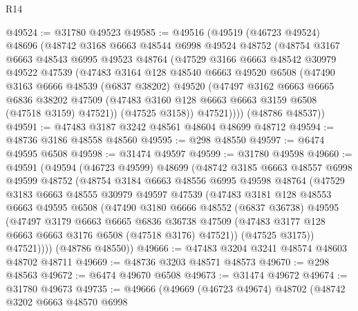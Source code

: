 \begin{lexlean}{R14}
\begin{coremodule}
@49524 := @31780 @49523
@49585 := @49516
    (@49519
      (@46723 @49524)
      @48696
      (@48742
        @3168
        @6663
        @48544
        @6998
        @49524
        @48752
        (@48754
          @3167
          @6663
          @48543
          @6995
          @49523
          @48764
          (@47529
            @3166
            @6663
            @48542
            @30979
            @49522
            @47539
            (@47483
              @3164
              @128
              @48540
              @6663
              @49520
              @6508
              (@47490
                @3163
                @6666
                @48539
                (@6837 @38202)
                @49520
                (@47497
                  @3162
                  @6663
                  @6665
                  @6836
                  @38202
                  @47509
                  (@47483 @3160 @128 @6663 @6663 @3159 @6508 (@47518 @3159) @47521))
                (@47525 @3158))
              @47521))))
      (@48786 @48537))
@49591 := @47483 @3187 @3242 @48561 @48604 @48699 @48712
@49594 := @48736 @3186 @48558 @48560
@49595 := @298 @48550
@49597 := @6474 @49595 @6508
@49598 := @31474 @49597
@49599 := @31780 @49598
@49660 := @49591
    (@49594
      (@46723 @49599)
      @48699
      (@48742
        @3185
        @6663
        @48557
        @6998
        @49599
        @48752
        (@48754
          @3184
          @6663
          @48556
          @6995
          @49598
          @48764
          (@47529
            @3183
            @6663
            @48555
            @30979
            @49597
            @47539
            (@47483
              @3181
              @128
              @48553
              @6663
              @49595
              @6508
              (@47490
                @3180
                @6666
                @48552
                (@6837 @36738)
                @49595
                (@47497
                  @3179
                  @6663
                  @6665
                  @6836
                  @36738
                  @47509
                  (@47483 @3177 @128 @6663 @6663 @3176 @6508 (@47518 @3176) @47521))
                (@47525 @3175))
              @47521))))
      (@48786 @48550))
@49666 := @47483 @3204 @3241 @48574 @48603 @48702 @48711
@49669 := @48736 @3203 @48571 @48573
@49670 := @298 @48563
@49672 := @6474 @49670 @6508
@49673 := @31474 @49672
@49674 := @31780 @49673
@49735 := @49666
    (@49669
      (@46723 @49674)
      @48702
      (@48742
        @3202
        @6663
        @48570
        @6998

\end{coremodule}
\end{lexlean}
